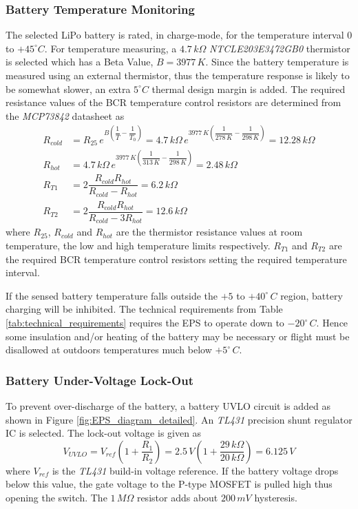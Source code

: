\subsubsection{Battery Temperature Monitoring}
The selected \ac{LiPo} battery is rated, in charge-mode, for the temperature interval $0$ to $+45^{\circ}C$. For temperature measuring, a $4.7\,k \Omega$ \textit{NTCLE203E3472GB0} thermistor is selected which has a Beta Value, $B=3977\,K$. Since the battery temperature is measured using an external thermistor, thus the temperature response is likely to be somewhat slower, an extra $5^{\circ}C$ thermal design margin is added. The required resistance values of the \ac{BCR} temperature control resistors are determined from the \textit{MCP73842} datasheet as 
%
\begin{equation}
\begin{split}
R_{cold}&=R_{25}\,e^{B(\dfrac{1}{T}-\dfrac{1}{T_0})}=4.7\,k\Omega \,e^{3977\,K(\dfrac{1}{278	\,K}-\dfrac{1}{298\,K})}=12.28\,k\Omega\\
R_{hot}&=4.7\,k\Omega \, e^{3977\,K(\dfrac{1}{313	\,K}-\dfrac{1}{298\,K})}=2.48\,k\Omega\\
R_{T1}&=2\dfrac{R_{cold}R_{hot}}{R_{cold}-R_{hot}}=6.2\,k\Omega\\
R_{T2}&=2\dfrac{R_{cold}R_{hot}}{R_{cold}-3R_{hot}}=12.6\,k\Omega
\end{split}
\end{equation}
%
where $R_{25}$, $R_{cold}$ and $R_{hot}$ are the thermistor resistance values at room temperature, the low and high temperature limits respectively. $R_{T1}$ and $R_{T2}$ are the required \ac{BCR} temperature control resistors setting the required temperature interval.

If the sensed battery temperature falls outside the $+5$ to $+40^{\circ}\,C$ region, battery charging will be inhibited. The technical requirements from Table \ref{tab:technical_requirements} requires the \ac{EPS} to operate down to $-20^{\circ}\,C$. Hence some insulation and/or heating of the battery may be necessary or flight must be disallowed at outdoors temperatures much below $+5^{\circ}\,C$.
%
\subsubsection{Battery Under-Voltage Lock-Out}
To prevent over-discharge of the battery, a battery \ac{UVLO} circuit is added as shown in Figure \ref{fig:EPS_diagram_detailed}. An \textit{TL431} precision shunt regulator \ac{IC} is selected. The lock-out voltage is given as
%
\begin{equation}
V_{UVLO}=V_{ref}(1+\dfrac{R_1}{R_2})=2.5\,V(1+\dfrac{29\,k \Omega}{20\,k \Omega})=6.125\,V
\end{equation}
%
where $V_{ref}$ is the \textit{TL431} build-in voltage reference. If the battery voltage drops below this value, the gate voltage to the P-type MOSFET is pulled high thus opening the switch. The $1\,M \Omega$ resistor adds about $200\,mV$ hysteresis. 

